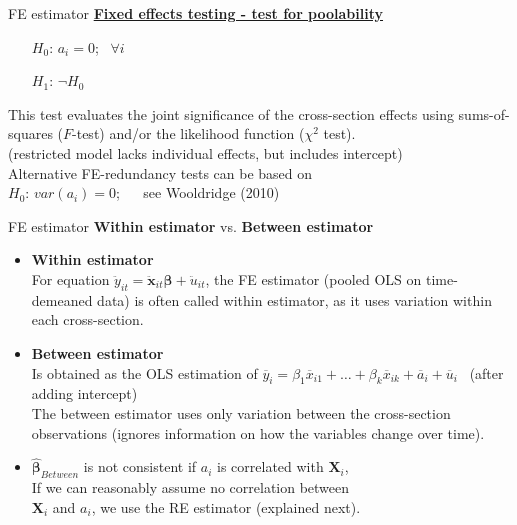 \documentclass[usenames,dvipsnames]{beamer}
\begin{document}
\begin{frame}{FE estimator}
\underline{\textbf{Fixed effects testing - test for poolability}}
\begin{itemize}
\item[$H_0$:] $a_i = 0$; \ $\forall i$
\item[$H_1$:] $\neg H_0$
\end{itemize}
\medskip
This test evaluates the joint significance of the cross-section effects using sums-of-squares ($F$-test) and/or the likelihood function ($\chi^2$ test). \\
\medskip
(restricted model lacks individual effects, but includes intercept) \\
\medskip
Alternative FE-redundancy tests can be based on \\$H_0$: $\textit{var}(a_i) = 0$; ~~
see Wooldridge (2010)
\end{frame}
\begin{frame}{FE estimator}
\textbf{Within estimator} vs. \textbf{Between estimator}
\medskip
\begin{itemize}
\item \textbf{Within estimator}\\
For equation  $\ddot{y}_{it} = \bm{\ddot{x}}_{it} \bm{\beta} + \ddot{u}_{it}$, the FE estimator (pooled OLS on time-demeaned data) is often called within estimator, as it uses variation within each cross-section.
\item \textbf{Between estimator}\\
Is obtained as the OLS estimation of $\overline{y}_i = \beta_1 \overline{x}_{i1} + \dots + \beta_k \overline{x}_{ik} + \overline{a}_i + \overline{u}_i$ \ (after adding intercept)\\
\medskip
The between estimator uses only variation between the cross-section observations (ignores information on how the variables change over time).\\
\medskip
\item $\bm{\hat{\beta}}_{\textit{Between}}$ is not consistent if $a_i$ is correlated with $\bm{X}_i$, \\If we can reasonably assume no correlation between \\$\bm{X}_i$ and $a_i$, we use the RE estimator (explained next). 
\end{itemize}
\end{frame}
\end{document}
